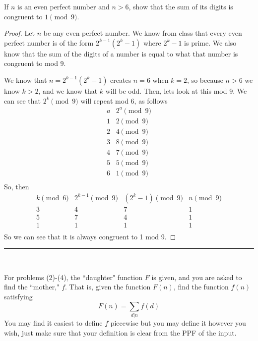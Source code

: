 \documentclass[11pt]{article}
\newenvironment{problem}[2][Problem]{\begin{trivlist}
\item[\hskip \labelsep {\bfseries #1}\hskip \labelsep {\bfseries #2.}]}{\end{trivlist}}
\begin{document}
\begin{problem}{14}
If $n$ is an even perfect number and $n>6$, show that the sum of its digits is congruent to $1\pmod{9}$.
\end{problem}

\begin{proof}
  Let $n$ be any even perfect number. We know from class that every even perfect number is of the form $2^{k-1}(2^k-1)$ where $2^{k}-1$ is prime. We also know that the sum of the digits of a number is equal to what that number is congruent to mod 9.

  We know that $n=2^{k-1}(2^k-1)$ creates $n=6$ when $k=2$, so because $n>6$ we know $k>2$, and we know that $k$ will be odd.
  Then, lets look at this mod 9.
  We can see that $2^k\pmod{9}$ will repeat mod 6, as follows
  \[
    \begin{array}{c|c}
      a & 2^{a}\pmod{9} \\
      \hline
      1 & 2 \pmod{9}    \\
      2 & 4 \pmod{9}    \\
      3 & 8 \pmod{9}    \\
      4 & 7 \pmod{9}    \\
      5 & 5 \pmod{9}    \\
      6 & 1 \pmod{9}    \\
    \end{array}
  \]
  So, then
  \[
    \begin{array}{c|c|c|c}
      k \pmod{6} & 2^{k-1} \pmod{9} & (2^k-1)\pmod{9} & n\pmod{9} \\
      \hline
      3          & 4                & 7               & 1         \\
      5          & 7                & 4               & 1         \\
      1          & 1                & 1               & 1         \\
    \end{array}
  \]
  So we can see that it is always congruent to 1 mod 9.
\end{proof}

\hrule
~\newline

For problems (2)-(4), the ``daughter" function $F$ is given, and you are asked to find the ``mother," $f$. That is, given the function $F(n)$, find the function $f(n)$ satisfying
\[
  F(n) = \sum_{d|n} f(d)
\]
You may find it easiest to define $f$ piecewise but you may define it however you wish, just make sure that your definition is clear from the PPF of the input.
\end{document}
